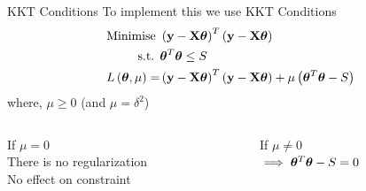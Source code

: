 \documentclass{beamer}
\begin{document}
\begin{frame}{KKT Conditions}
To implement this we use KKT Conditions
\pause
\begin{align*}
\text{Minimise } & \left(\mathbf{y}-\mathbf{X}\boldsymbol{\theta}\right)^T\left(\mathbf{y}-\mathbf{X}\boldsymbol{\theta}\right) \\
\text{s.t. } & \boldsymbol{\theta} ^T\boldsymbol{\theta} \leq S \\
L\left(\boldsymbol{\theta}, \mu \right) =& \left(\mathbf{y}-\mathbf{X}\boldsymbol{\theta}\right)^T\left(\mathbf{y}-\mathbf{X}\boldsymbol{\theta}\right) + \mu\left(\boldsymbol{\theta}^T\boldsymbol{\theta} - S\right)
\end{align*}
where, $\mu \geq 0$ (and $\mu = \delta^2$)\bigskip

\pause
\begin{columns}
\begin{column}{0.4\textwidth}
If $\mu = 0$ \\
There is no regularization \\
No effect on constraint
\end{column}
\pause
\begin{column}{0.4\textwidth}
If $\mu\neq 0$ \\
$\implies \boldsymbol{\theta}^T\boldsymbol{\theta} - S = 0$ 
\end{column}
\end{columns}
\end{frame}
\end{document}
